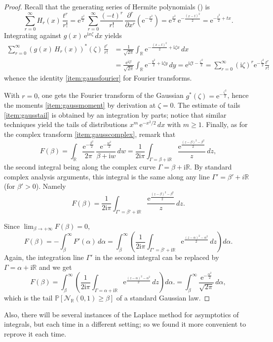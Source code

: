 \documentclass[12pt,a4paper,reqno]{amsart}
\theoremstyle{remark}
\newcommand{\R}{\mathbb{R}}
\newcommand{\E}{\mathrm{e}}
\newcommand{\I}{\mathrm{i}}
\newcommand{\proba}{\mathbb{P}}
\begin{document}
\begin{proof}    
Recall that the generating series of Hermite polynomials (\cite[Chapter 5]{Sze75}) is 
$$\sum_{r =0}^{\infty} H_{r}(x)\,\frac{t^{r}}{r!}=\E^{\frac{x^2}{2}}\,\sum_{r=0}^\infty\frac{(-t)^r}{r!}\,\frac{\partial^r}{\partial x^r}\left(\E^{-\frac{x^2}{2}}\right)= \E^{\frac{x^2}{2}}\,\E^{-\frac{(x-t)^2}{2}}=\E^{-\frac{t^2}{2}+tx}.$$ 
Integrating against $g(x)\,\E^{\I x \zeta}\,dx$ yields
\begin{align*}\sum_{r=0}^\infty (g(x)\,H_r(x))^*(\zeta)\,\frac{t^r}{r!}&=\frac{1}{\sqrt{2\pi}}\int_\R \E^{-\frac{(x-t)^2}{2}+\I\zeta x}\,dx\\
&=\frac{\E^{\I\zeta t}}{\sqrt{2\pi}}\int_\R \E^{-\frac{y^2}{2}+\I\zeta y}\,dy = \E^{\I\zeta t-\frac{\zeta^2}{2}} = \sum_{r=0}^\infty (\I \zeta)^r\E^{-\frac{\zeta^2}{2}}\frac{t^r}{r!}
\end{align*}
whence the identity \eqref{item:gaussfourier} for Fourier transforms.\bigskip

With $r=0$, one gets the Fourier transform of the Gaussian $g^*(\zeta)=\E^{-\frac{\zeta^2}{2}}$, hence the moments \eqref{item:gaussmoment} by derivation at $\zeta=0$. The estimate of tails \eqref{item:gausstail} is obtained by an integration by parts; notice that similar techniques yield the tails of distributions $x^m\,\E^{-x^2/2}\,dx$ with $m\geq 1$. Finally, as for the complex transform \eqref{item:gausscomplex}, remark that 
$$F(\beta)=\int_{\R}\frac{\E^{-\frac{\beta^{2}}{2}}}{2\pi}\,\frac{\E^{-\frac{w^{2}}{2}}}{\beta+\I w}\,dw=\frac{1}{2\I\pi} \int_{\Gamma=\beta+ \I \R}\frac{\E^{\frac{(z-\beta)^{2}-\beta^{2}}{2}}}{z}\,dz,$$ the second integral being along the complex curve $\Gamma=\beta+\I \R$. 
By standard complex analysis arguments, this integral is the same along any line $\Gamma'=\beta'+i\R$ (for $\beta' >0$).
Namely
\[F(\beta)= \frac{1}{2\I\pi} \int_{\Gamma'=\beta'+ \I \R}\frac{\E^{\frac{(z-\beta)^{2}-\beta^{2}}{2}}}{z}\,dz.\]

Since $\lim_{\beta \to +\infty} F(\beta)=0$, 
$$
F(\beta)=-\int_\beta^\infty F'(\alpha)\,d\alpha
=\int_{\beta}^{\infty} \left(\frac{1}{2\I \pi}\int_{\Gamma'=\beta'+\I \R} \E^{\frac{(z-\alpha)^{2}-\alpha^{2}}{2}}\,dz\right)d\alpha.
$$
Again, the integration line $\Gamma'$ in the second integral can be replaced by 
$\Gamma=\alpha+\I \R$ and we get
$$F(\beta)
=\int_{\beta}^{\infty} \left(\frac{1}{2\I \pi}\int_{\Gamma=\alpha+\I \R} \E^{\frac{(z-\alpha)^{2}-\alpha^{2}}{2}}\,dz\right)d\alpha.
=\int_{\beta}^{\infty} \frac{\E^{-\frac{\alpha^{2}}{2}}}{\sqrt{2\pi}}\,d\alpha,$$
which is the tail $\proba[\mathcal{N}_{\R}(0,1)\geq \beta]$ of a standard Gaussian law.
\end{proof}
\noindent Also, there will be several instances of the Laplace method for asymptotics of integrals, but each time in a different setting; so we found it more convenient to reprove it each time.
\bigskip
\bigskip
\end{document}
